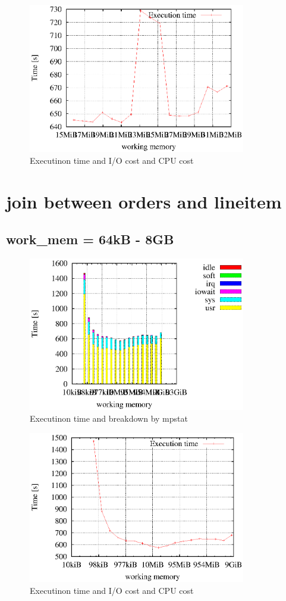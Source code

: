 \documentclass[11pt,a4paper]{jsarticle}
\begin{document}
\begin{figure}[thbp]
 \begin{center}
  \includegraphics[width=95mm]{q8_16_32_exectime.eps}
 \end{center}
 \caption{Executinon time and I/O cost and CPU cost}
 \label{fig:q8exectime1632}
\end{figure}

\clearpage
\section{join between orders and lineitem}
\subsection{work\_mem = 64kB - 8GB}
\begin{figure}[thbp]
 \begin{center}
  \includegraphics[width=95mm]{oljoincputime.eps}
 \end{center}
 \caption{Executinon time and breakdown by mpstat}
 \label{fig:q8cputime}
\end{figure}

\begin{figure}[thbp]
 \begin{center}
  \includegraphics[width=95mm]{oljoinexectime.eps}
 \end{center}
 \caption{Executinon time and I/O cost and CPU cost}
 \label{fig:q8exectime}
\end{figure}
\end{document}
